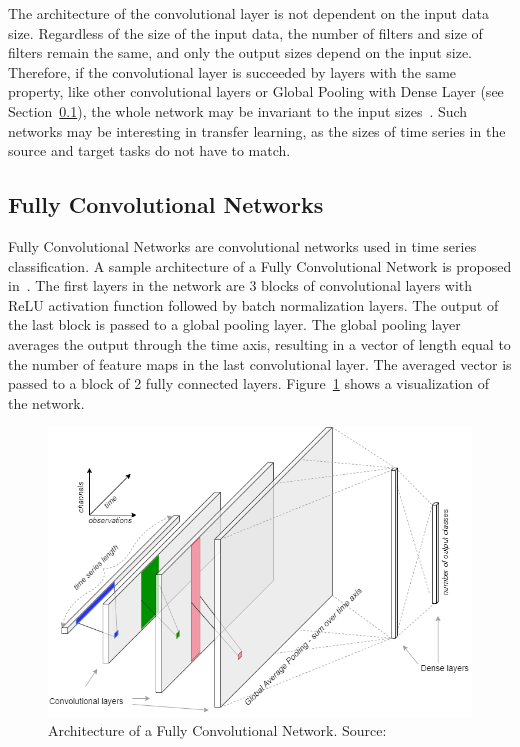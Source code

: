 \documentclass[a4paper,11pt,twoside]{report}
\theoremstyle{definition}
\begin{document}
The architecture of the convolutional layer is not dependent on the input data size. Regardless of the size of the input data, the number of filters and size of filters remain the same, and only the output sizes depend on the input size. Therefore, if the convolutional layer is  succeeded by layers with the same property, like other convolutional layers or Global Pooling with Dense Layer (see Section~\ref{FCN}), the whole network may be invariant to the input sizes~\cite{dl_tsc}. Such networks may be interesting in transfer learning, as the sizes of time series in the source and target tasks do not have to match.

\subsection{Fully Convolutional Networks}\label{FCN}
Fully Convolutional Networks are convolutional networks used in time series classification. A sample architecture of a Fully Convolutional Network is proposed in~\cite{dl_tsc, tsc_scratch}. The first layers in the network are 3 blocks of convolutional layers with ReLU activation function followed by batch normalization layers. The output of the last block is passed to a global pooling layer. The global pooling layer averages the output through the time axis, resulting in a vector of length equal to the number of feature maps in the last convolutional layer. The averaged vector is passed to a block of 2 fully connected layers. Figure~\ref{fig:FCN_img} shows a visualization of the network.



\FloatBarrier

\begin{figure}[h!]
\centering
\includegraphics[width=15.5cm]{imgs/fcn.png}
\caption{Architecture of a Fully Convolutional Network. Source:~\cite{dl_tsc}}
\label{fig:FCN_img}
\end{figure}
\end{document}
